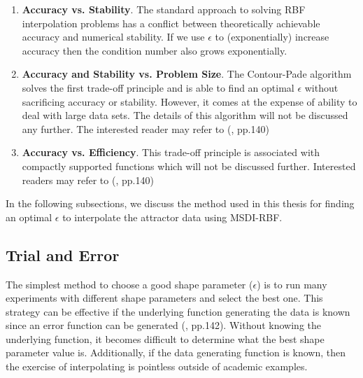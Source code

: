                \begin{enumerate}
                    \item \textbf{Accuracy vs. Stability}. The standard approach to solving RBF interpolation problems
                            has a conflict between theoretically achievable accuracy and numerical stability. If we use
                            $\epsilon$ to (exponentially) increase accuracy then the condition number also grows
                            exponentially.
                    \item \textbf{Accuracy and Stability vs. Problem Size}. The Contour-Pade algorithm solves the first
                            trade-off principle and is able to find an optimal $\epsilon$ without sacrificing accuracy
                            or stability. However, it comes at the expense of ability to deal with large data
                            sets. The details of this algorithm will not be discussed any further. The interested reader
                            may refer to (\cite{item:1}, pp.140)
                    \item \textbf{Accuracy vs. Efficiency}. This trade-off principle is associated with compactly supported
                            functions which will not be discussed further. Interested readers may refer to (\cite{item:1}, pp.140)
                \end{enumerate}
                In the following subsections, we discuss the method used in this thesis for finding an optimal $\epsilon$ to interpolate
                the attractor data using MSDI-RBF.\\

        \subsection{Trial and Error}

                The simplest method to choose a good shape parameter ($\epsilon$) is to run many experiments with different shape
                parameters and select the best one. This strategy can be effective if the underlying function generating
                the data is known since an error function can be generated (\cite{item:1}, pp.142). Without knowing the underlying
                function, it becomes difficult to determine what the best shape parameter value is. Additionally, if
                the data generating function is known, then the exercise of interpolating is pointless outside of
                academic examples.\\


